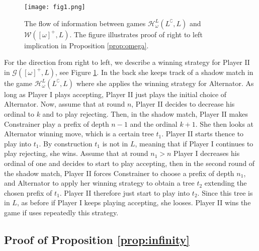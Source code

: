 \begin{figure}
\begin{center}
\texttt{[image: fig1.png]}
\caption{The flow of information between games $\mathcal{H}^{L}_\omega(L^\complement, L)$ and $\mathcal{W}([\omega]^+, L)$. The figure illustrates proof of right to left implication in Proposition \ref{prop:omega}. 
\label{myfig1} }
\end{center}
\end{figure}


For the direction from right to left, we describe a winning strategy for Player II in $\mathcal{G}([\omega]^+, L)$, see Figure \ref{myfig1}. In the back she keeps track of a shadow match in the game $\mathcal{H}^{L}_\omega(L^\complement, L)$ where she applies the  winning strategy for Alternator. 
As long as Player I plays accepting, Player II just plays the initial choice of Alternator. Now, assume that at round $n$, Player II decides to decrease his ordinal to $k$ and to play rejecting. Then, in the shadow match, Player II makes Constrainer play a prefix of depth $n-1$ and the ordinal $k+1$. She then looks at Alternator winning move, which is a certain tree $t_1$. Player II starts thence to play into $t_1$. By construction $t_1$ is not in $L$, meaning that if Player I continues to play rejecting, she wins. Assume that at round $n_1> n$ Player I decreases his ordinal of one and decides to start to play accepting, then in the second round of the shadow match, Player II forces Constrainer to choose a prefix of depth $n_1$, and Alternator to apply her winning strategy to obtain a tree $t_2$ extending the chosen prefix of $t_1$. Player II therefore just start to play into $t_2$. Since this tree is in $L$, as before if Player I keeps playing accepting, she looses. Player II wins the game if uses repeatedly this strategy. 


\subsection*{Proof of Proposition \ref{prop:infinity}}


